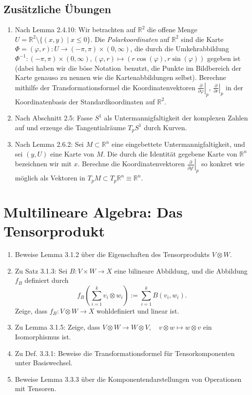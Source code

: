 \documentclass[a4paper]{scrartcl}
\newcommand{\R}{\mathbb{R}}
\begin{document}
	\subsection{Zusätzliche Übungen}
	\begin{enumerate}
		\item Nach Lemma 2.4.10:
			Wir betrachten auf $\R^2$ die offene Menge $U = \R^2 \setminus\{(x,y) \mid x \le 0\}$. Die \emph{Polarkoordinaten} auf $\R^2$ sind die Karte $\Phi = (\varphi,r) \colon U \to (-\pi,\pi) \times (0,\infty)$, die durch die Umkehrabbildung $\Phi^{-1}\colon (-\pi,\pi)\times(0,\infty), (\varphi,r) \mapsto (r\cos(\varphi), r\sin(\varphi))$ gegeben ist (dabei haben wir die \glqq böse Notation\grqq\ benutzt, die Punkte im Bildbereich der Karte genauso zu nennen wie die Kartenabbildungen selbst). Berechne mithilfe der Transformationsformel die Koordinatenvektoren $\left.\frac{\partial}{\partial\varphi}\right|_p$, $\left.\frac{\partial}{\partial r}\right|_p$ in der Koordinatenbasis der Standardkoordinaten auf $\R^2$.
		\item Nach Abschnitt 2.5:
			Fasse $S^1$ als Untermannigfaltigkeit der komplexen Zahlen auf und erzeuge die Tangentialräume $T_pS^1$ durch Kurven.
		\item Nach Lemma 2.6.2:
			Sei $M \subset \R^n$ eine eingebettete Untermannigfaltigkeit, und sei $(y,U)$ eine Karte von $M$. Die durch die Identität gegebene Karte von $\R^n$ bezeichnen wir mit $x$. Berechne die Koordinatenvektoren $\left.\frac{\partial}{\partial y^i}\right|_p$ so konkret wie möglich als Vektoren in $T_pM \subset T_p\R^n \equiv \R^n$.
	\end{enumerate}

	\section{Multilineare Algebra: Das Tensorprodukt}
	\begin{enumerate}
		\item Beweise Lemma 3.1.2 über die Eigenschaften des Tensorprodukts $V\otimes W$.
		\item Zu Satz 3.1.3: Sei $B\colon V\times W \to X$ eine bilineare Abbildung, und die Abbildung $f_B$ definiert durch 
			\[f_B\left(\sum_{i=1}^k v_i \otimes w_i\right) := \sum_{i=1}^k B(v_i,w_i).\]
			Zeige, dass $f_B\colon V\otimes W\rightarrow X$ wohldefiniert und linear ist.
		\item Zu Lemma 3.1.5: Zeige, dass $V\otimes W\rightarrow W\otimes V,\quad v\otimes w \mapsto w\otimes v$ ein Isomorphismus ist.
		\item Zu Def. 3.3.1: Beweise die Transformationsformel für Tensorkomponenten unter Basiswechsel.
		\item Beweise Lemma 3.3.3 über die Komponentendarstellungen von Operationen mit Tensoren.
	\end{enumerate}
\end{document}
